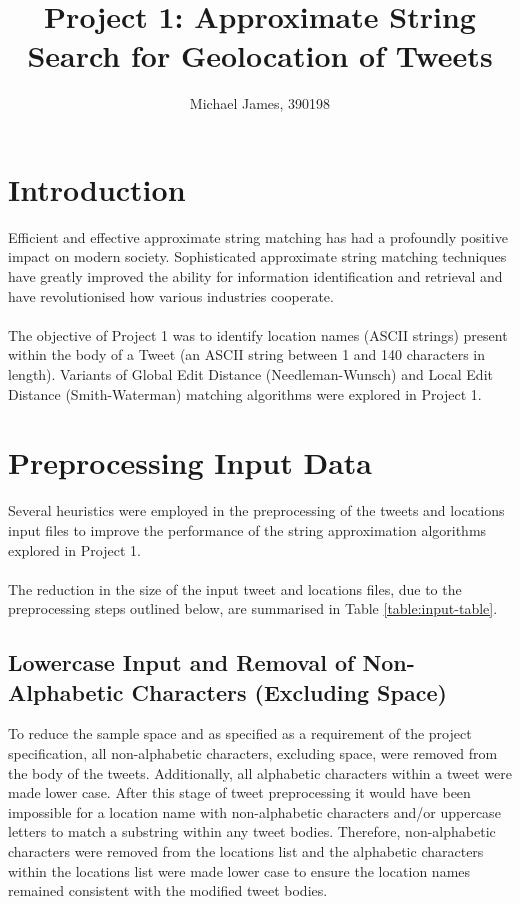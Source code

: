 \documentclass[11pt,a4paper]{article}
\author{Michael James, 390198}
\begin{document}
\title{Project 1: Approximate String Search for Geolocation of Tweets}
\maketitle

\section{Introduction}
Efficient and effective approximate string matching has had a profoundly positive impact on modern society. Sophisticated approximate string matching techniques have greatly improved the ability for information identification and retrieval and have revolutionised how various industries cooperate.\\\\
The objective of Project 1 was to identify location names (ASCII strings) present within the body of a Tweet (an ASCII string between 1 and 140 characters in length). Variants of Global Edit Distance (Needleman-Wunsch) and Local Edit Distance (Smith-Waterman) matching algorithms were explored in Project 1. 

\section{Preprocessing Input Data}  

Several heuristics were employed in the preprocessing of the tweets and locations input files to improve the performance of the string approximation algorithms explored in Project 1.\\\\
The reduction in the size of the input tweet and locations files, due to the preprocessing steps outlined below, are summarised in Table \ref{table:input-table}.

\subsection{Lowercase Input and Removal of Non-Alphabetic Characters (Excluding Space)}
\label{subsec:alpha}

To reduce the sample space and as specified as a requirement of the project specification, all non-alphabetic characters, excluding space, were removed from the body of the tweets. Additionally, all alphabetic characters within a tweet were made lower case. After this stage of tweet preprocessing it would have been impossible for a location name with non-alphabetic characters and/or uppercase letters to match a substring within any tweet bodies. Therefore, non-alphabetic characters were removed from the locations list and the alphabetic characters within the locations list were made lower case to ensure the location names remained consistent with the modified tweet bodies.
\end{document}
